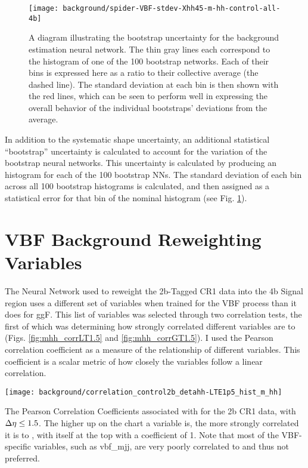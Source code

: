     \begin{figure}[tbh]
        \texttt{[image: background/spider-VBF-stdev-Xhh45-m-hh-control-all-4b]}
        \caption{
            A diagram illustrating the bootstrap uncertainty for the background estimation neural network.
            The thin gray lines each correspond to the \mhh histogram of one of the 100 bootstrap networks.
            Each of their bins is expressed here as a ratio to their collective average (the dashed line).
            The standard deviation at each bin is then shown with the red lines,
                which can be seen to perform well in expressing the overall behavior
                of the individual bootstraps' deviations from the average.
        }
        \label{fig:spider}
    \end{figure}

    In addition to the systematic shape uncertainty,
        an additional statistical ``bootstrap'' uncertainty is calculated to account for the variation of the bootstrap neural networks.
    This uncertainty is calculated by producing an \mhh histogram for each of the 100 bootstrap NNs.
    The standard deviation of each bin across all 100 bootstrap histograms is calculated,
        and then assigned as a statistical error for that bin of the nominal histogram (see Fig. \ref{fig:spider}).


\FloatBarrier
\section{VBF Background Reweighting Variables} \label{sec:vbf_bgdNNRW}

    The Neural Network used to reweight the 2b-Tagged CR1 data into the 4b Signal region
        uses a different set of variables when trained for the VBF process than it does for ggF.
    This list of variables was selected through two correlation tests,
        the first of which was determining how strongly correlated different variables are to \mhh
        (Figs. \ref{fig:mhh_corrLT1.5} and \ref{fig:mhh_corrGT1.5}).
    I used the Pearson correlation coefficient as a measure of the relationship of different variables.
    This coefficient is a scalar metric of how closely the variables follow a linear correlation.


    \begin{sidewaysfigure}[tbh]
        \texttt{[image: background/correlation\_control2b\_detahh-LTE1p5\_hist\_m\_hh]}
        \caption{
        }
        \label{fig:mhh_corrLT1.5}
            The Pearson Correlation Coefficients associated with \mhh for the 2b CR1 data,
                with $\Delta \eta \leq 1.5$.
            The higher up on the chart a variable is, the more strongly correlated it is to \mhh,
                with \mhh itself at the top with a coefficient of 1.
            Note that most of the VBF-specific variables, such as vbf\_mjj, are very poorly correlated to \mhh and thus not preferred.
    \end{sidewaysfigure}

